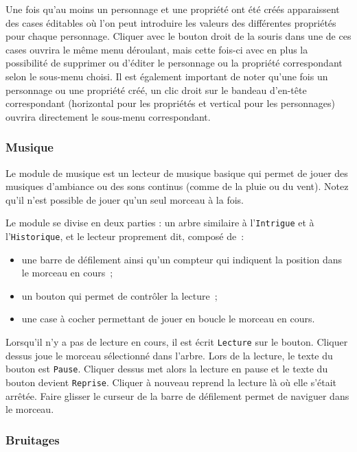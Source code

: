 \documentclass[a4paper,12pt]{article}
\newcommand*{\interfaceitem}[1]{\texttt{#1}}
\begin{document}
Une fois qu'au moins un personnage et une propriété ont été créés apparaissent des cases éditables où l'on peut introduire les valeurs des différentes propriétés pour chaque personnage.
Cliquer avec le bouton droit de la souris dans une de ces cases ouvrira le même menu déroulant, mais cette fois-ci avec en plus la possibilité de supprimer ou d'éditer le personnage ou la propriété correspondant selon le sous-menu choisi.
Il est également important de noter qu'une fois un personnage ou une propriété créé, un clic droit sur le bandeau d'en-tête correspondant (horizontal pour les propriétés et vertical pour les personnages) ouvrira directement le sous-menu correspondant.

\subsubsection{Musique}
\label{sec:musique}

Le module de musique est un lecteur de musique basique qui permet de jouer des musiques d'ambiance ou des sons continus (comme de la pluie ou du vent).
Notez qu'il n'est possible de jouer qu'un seul morceau à la fois.

Le module se divise en deux parties : un arbre similaire à l'\interfaceitem{Intrigue} et à l'\interfaceitem{Historique}, et le lecteur proprement dit, composé de~:
\begin{itemize}
    \item une barre de défilement ainsi qu'un compteur qui indiquent la position dans le morceau en cours~;
    \item un bouton qui permet de contrôler la lecture~;
    \item une case à cocher permettant de jouer en boucle le morceau en cours.
\end{itemize}
Lorsqu'il n'y a pas de lecture en cours, il est écrit \interfaceitem{Lecture} sur le bouton.
Cliquer dessus joue le morceau sélectionné dans l'arbre.
Lors de la lecture, le texte du bouton est \interfaceitem{Pause}.
Cliquer dessus met alors la lecture en pause et le texte du bouton devient \interfaceitem{Reprise}.
Cliquer à nouveau reprend la lecture là où elle s'était arrêtée.
Faire glisser le curseur de la barre de défilement permet de naviguer dans le morceau.

\subsubsection{Bruitages}
\label{sec:bruitages}
\end{document}
